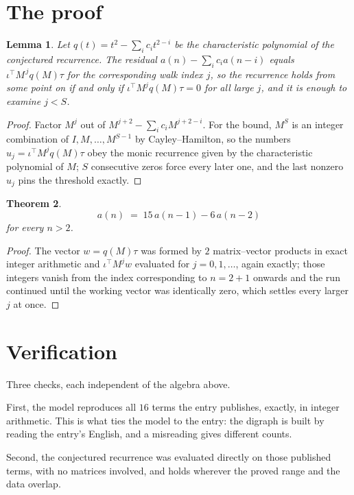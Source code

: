 \documentclass[11pt,a4paper]{article}
\theoremstyle{plain}
\newtheorem{theorem}{Theorem}
\newtheorem{lemma}[theorem]{Lemma}
\theoremstyle{definition}
\begin{document}
\section{The proof}

\begin{lemma}\label{lem:crit}
Let $q(t)=t^{2}-\sum_i c_it^{2-i}$ be the characteristic polynomial of the
conjectured recurrence. The residual $a(n)-\sum_ic_ia(n-i)$ equals
$\iota^{\!\top}M^{\,j}q(M)\tau$ for the corresponding walk index $j$, so the recurrence
holds from some point on if and only if $\iota^{\!\top}M^{j}q(M)\tau=0$ for all large $j$,
and it is enough to examine $j<S$.
\end{lemma}

\begin{proof}
Factor $M^{j}$ out of $M^{j+2}-\sum_ic_iM^{j+2-i}$. For the bound, $M^{S}$
is an integer combination of $I,M,\dots,M^{S-1}$ by Cayley--Hamilton, so the numbers
$u_j=\iota^{\!\top}M^{j}q(M)\tau$ obey the monic recurrence given by the characteristic
polynomial of $M$; $S$ consecutive zeros force every later one, and the last nonzero $u_j$
pins the threshold exactly.
\end{proof}

\begin{theorem}
\[
a(n)\;=\;15\,a(n-1) - 6\,a(n-2)
\]
for every $n>2$.
\end{theorem}

\begin{proof}
The vector $w=q(M)\tau$ was formed by $2$ matrix--vector products in exact integer
arithmetic and $\iota^{\!\top}M^{j}w$ evaluated for $j=0,1,\dots$, again exactly; those
integers vanish from the index corresponding to $n=2+1$ onwards and the run continued
until the working vector was identically zero, which settles every larger $j$ at once.
\end{proof}

\section{Verification}

Three checks, each independent of the algebra above.

First, the model reproduces all $16$ terms the entry publishes, exactly, in integer
arithmetic. This is what ties the model to the entry: the digraph is built by reading the
entry's English, and a misreading gives different counts.

Second, the conjectured recurrence was evaluated directly on those published terms, with no
matrices involved, and holds wherever the proved range and the data overlap.
\end{document}
